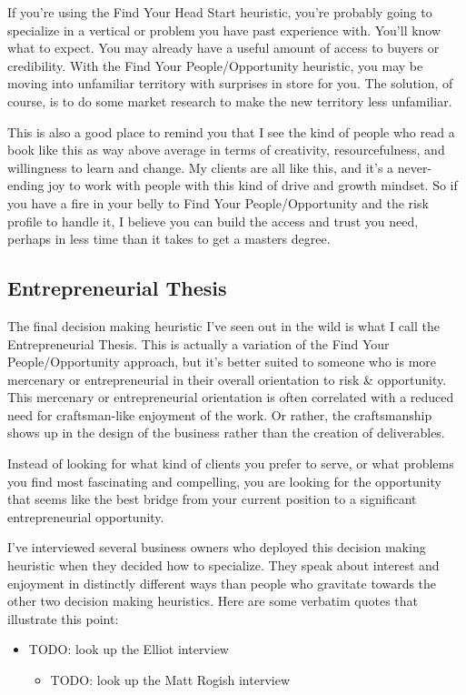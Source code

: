 If you're using the Find Your Head Start heuristic, you're probably going to specialize in a vertical or problem you have past experience with. You'll know what to expect. You may already have a useful amount of access to buyers or credibility. With the Find Your People/Opportunity heuristic, you may be moving into unfamiliar territory with surprises in store for you. The solution, of course, is to do some market research to make the new territory less unfamiliar.

This is also a good place to remind you that I see the kind of people who read a book like this as way above average in terms of creativity, resourcefulness, and willingness to learn and change. My clients are all like this, and it's a never-ending joy to work with people with this kind of drive and growth mindset. So if you have a fire in your belly to Find Your People/Opportunity and the risk profile to handle it, I believe you can build the access and trust you need, perhaps in less time than it takes to get a masters degree.

\subsection{\textbf{Entrepreneurial Thesis}}

The final decision making heuristic I've seen out in the wild is what I call the Entrepreneurial Thesis. This is actually a variation of the Find Your People/Opportunity approach, but it's better suited to someone who is more mercenary or entrepreneurial in their overall orientation to risk \& opportunity. This mercenary or entrepreneurial orientation is often correlated with a reduced need for craftsman-like enjoyment of the work. Or rather, the craftsmanship shows up in the design of the business rather than the creation of deliverables.

Instead of looking for what kind of clients you prefer to serve, or what problems you find most fascinating and compelling, you are looking for the opportunity that seems like the best bridge from your current position to a significant entrepreneurial opportunity.

I've interviewed several business owners who deployed this decision making heuristic when they decided how to specialize. They speak about interest and enjoyment in distinctly different ways than people who gravitate towards the other two decision making heuristics. Here are some verbatim quotes that illustrate this point:

\begin{itemize}
\item TODO: look up the Elliot interview


\begin{itemize}
\item TODO: look up the Matt Rogish interview
\end{itemize}
\end{itemize}

